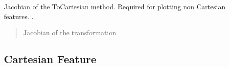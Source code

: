 \documentclass[letterpaper,10pt,english]{sphinxmanual}
\begin{document}
\begin{fulllineitems}
\begin{fulllineitems}
\end{fulllineitems}


\begin{fulllineitems}
\label{\detokenize{Feature:Feature.Feature.J_2c}}
\pysigstartsignatures
{}
\pysigstopsignatures
\sphinxAtStartPar
Jacobian of the ToCartesian method. Required for plotting non Cartesian features.
.
\begin{quote}\begin{description}
\sphinxAtStartPar
Jacobian of the transformation

\end{description}\end{quote}

\end{fulllineitems}


\end{fulllineitems}



\subsection{Cartesian Feature}
\label{\detokenize{Feature:cartesian-feature}}
\begin{figure}[htbp]
\centering

\noindent{}
\end{figure}
\end{document}
